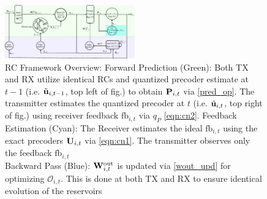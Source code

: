 \documentclass[conference]{IEEEtran}
\begin{document}
{\begin{figure}[ht]
\centering
\includegraphics[width=0.5\textwidth]{images/system2.pdf}
\caption{RC Framework Overview: Forward Prediction (Green): Both TX and RX utilize identical RCs and quantized precoder estimate at $t-1$ (i.e. $\tilde{{\bf u}}_{i,t-1}$, top left of fig.) to obtain ${\bf P}_{i,t}$ via \eqref{pred_op}. The transmitter estimates the quantized precoder at $t$ (i.e. $\tilde{{\bf u}}_{i,t}$, top right of fig.) using receiver feedback $\text{fb}_{i,t}$ via $q_P$ \eqref{eqn:cn2}.
Feedback Estimation (Cyan): The Receiver estimates the ideal $\text{fb}_{i,t}$ using the exact precoders ${\bf U}_{i,t}$ via \eqref{eqn:cn1}. The transmitter observes only the feedback $\text{fb}_{i,t}$\\ Backward Pass (Blue): ${\bf W}^{\text{out}}_{i,t}$ is updated via \eqref{wout_upd} for optimizing $\mathcal{O}_{i,t}$. This is done at both TX and RX to ensure identical evolution of the reservoirs}
\label{res_overview}
\end{figure}

}
\end{document}
